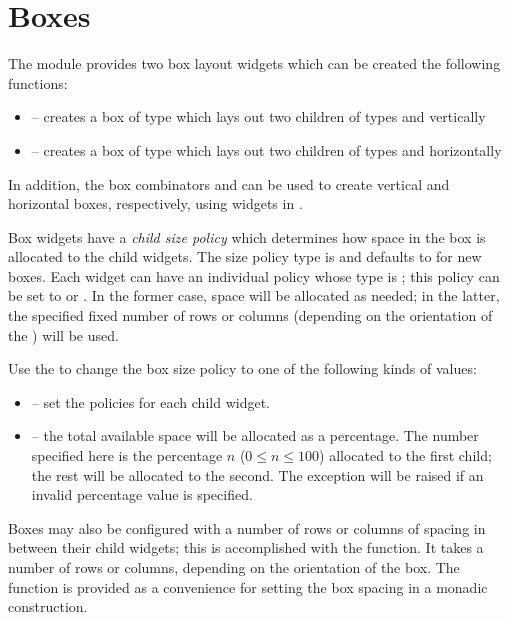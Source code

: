 \section{Boxes}

The  module provides two box layout widgets which can be
created the following functions:

\begin{itemize}
\item {} -- creates a box of type  which
  lays out two children of types  and 
  vertically
\item {} -- creates a box of type  which
  lays out two children of types  and 
  horizontally
\end{itemize}

In addition, the box combinators \fw{<-->} and \fw{<++>} can be used
to create vertical and horizontal boxes, respectively, using widgets
in .

Box widgets have a \textit{child size policy} which determines how
space in the box is allocated to the child widgets.  The size policy
type is  and defaults to  for new boxes.  Each widget can have an individual policy
whose type is ; this policy can be set to
 or .  In the former case, space will be
allocated as needed; in the latter, the specified fixed number of rows
or columns (depending on the orientation of the ) will be
used.

Use the  to change the box size policy to
one of the following kinds of values:

\begin{itemize}
\item {} -- set the
  policies for each child widget.
\item {} -- the total available space will be
  allocated as a percentage.  The number specified here is the
  percentage $n$ ($0 \le n \le 100$) allocated to the first child; the
  rest will be allocated to the second.  The  exception
  will be raised if an invalid percentage value is specified.
\end{itemize}

Boxes may also be configured with a number of rows or columns of
spacing in between their child widgets; this is accomplished with the
 function.  It takes a number of rows or columns,
depending on the orientation of the box.  The function
 is provided as a convenience for setting the box
spacing in a monadic construction.

